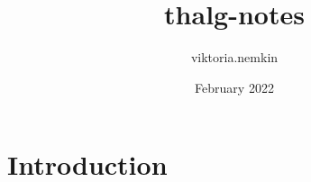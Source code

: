 \documentclass{article}
\title{thalg-notes}
\author{viktoria.nemkin }
\date{February 2022}
\begin{document}
\maketitle

\section{Introduction}
\end{document}
